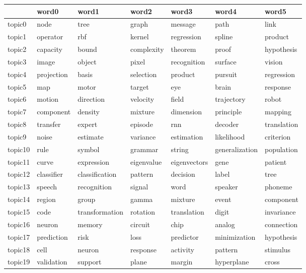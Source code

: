 \documentclass[letterpaper]{article}
\begin{document}
\begin{figure}[ht]
  \centering
  \begin{tabular}{l | l l l l l l}
    &     word0    &      word1 &          word2 &         word3 & word4 &        word5 \\ \hline
    topic0 & 	node & 	tree & 	graph & 	message & 	path & 	link \\
    topic1 & 	operator & 	rbf & 	kernel & 	regression & 	spline & product \\
    topic2 & 	capacity & 	bound & 	complexity & 	theorem & 	proof & hypothesis \\
    topic3 & 	image & 	object & 	pixel & 	recognition & 	surface & vision \\
    topic4 & 	projection & 	basis & 	selection & 	product & 	pursuit & 	regression \\
    topic5 & 	map & 	motor & 	target & 	eye & 	brain & 	response \\
    topic6 & 	motion & 	direction & 	velocity & 	field & 	trajectory & 	robot \\
    topic7 & 	component & 	density & 	mixture & 	dimension & 	principle & 	mapping \\
    topic8 & 	transfer & 	expert & 	episode & 	rnn & 	decoder & 	translation \\
    topic9 & 	noise & 	estimate & 	variance & 	estimation & 	likelihood & 	criterion \\
    topic10 & 	rule & 	symbol & 	grammar & 	string & 	generalization & 	population \\
    topic11 & 	curve & 	expression & 	eigenvalue & 	eigenvectors & 	gene & 	patient \\
    topic12 & 	classifier & 	classification & 	pattern & 	decision & 	label & 	tree \\
    topic13 & 	speech & 	recognition & 	signal & 	word & 	speaker & 	phoneme \\
    topic14 & 	region & 	group & 	gamma & 	mixture & 	event & 	component \\
    topic15 & 	code & 	transformation & 	rotation & 	translation & 	digit & 	invariance \\
    topic16 & 	neuron & 	memory & 	circuit & 	chip & 	analog & 	connection \\
    topic17 & 	prediction & 	risk & 	loss & 	predictor & 	minimization & 	hypothesis \\
    topic18 & 	cell & 	neuron & 	response & 	activity & 	pattern & 	stimulus \\
    topic19 & 	validation & 	support & 	plane & 	margin & 	hyperplane & 	cross \\

\end{tabular}
\end{figure}
\end{document}
